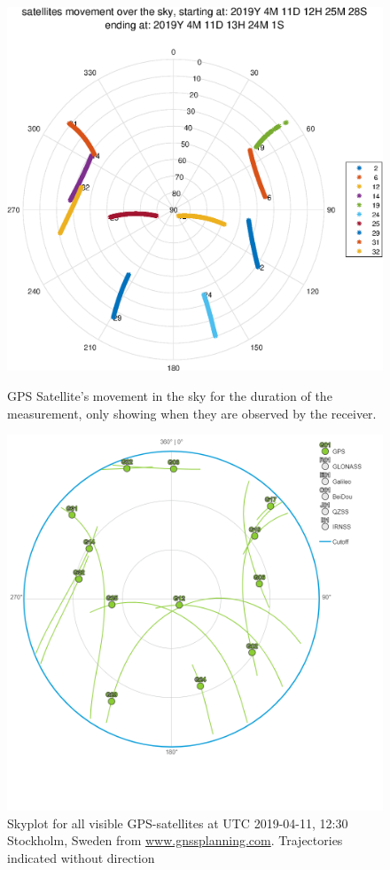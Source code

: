 \begin{figure}
\begin{minipage}{0.49\textwidth}
\includegraphics[width=\textwidth]{Results/satsInSky.eps}
\caption{\label{fig:skyplot} GPS Satellite's movement in the sky for the duration of the measurement, only showing when they are observed by the receiver.}
\end{minipage}
\begin{minipage}{0.49\textwidth}
\vspace{3 mm}
\includegraphics[width=\textwidth]{Results/skyplot190411-1230}
\caption{\label{fig:skyplotGNSSPLANNING} Skyplot for all visible GPS-satellites at UTC 2019-04-11, 12:30 Stockholm, Sweden from \url{www.gnssplanning.com}. Trajectories indicated without direction}
\end{minipage}
\end{figure}
